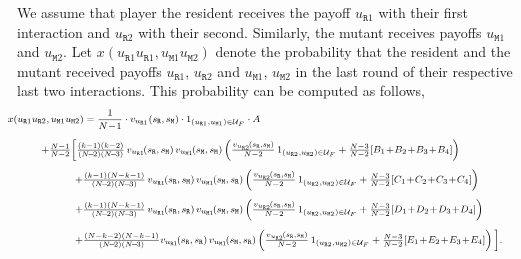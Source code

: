 \documentclass[11pt]{article}
\def\resident{\texttt{R}}
\def\mutant{\texttt{M}}
\def\strategy{s}
\theoremstyle{plainCl1}
\theoremstyle{plainCl2}
\begin{document}

We assume that player the resident receives the payoff \(u_{\resident1}\) with their first interaction and \(u_{\resident 2}\) with their second.
Similarly, the mutant receives payoffs \(u_{\mutant 1}\) and \(u_{\mutant 2}\). 
Let \(x(u_{\resident1} u_{\resident1}, u_{\mutant 1} u_{\mutant 2})\) denote the probability that the resident and the mutant received payoffs  \(u_{\resident1}\), \(u_{\resident2}\) and \(u_{\mutant 1}\), \(u_{\mutant 2}\) in the last round of their respective last two interactions.
This probability can be computed as follows, 
\begin{equation} \label{Eq:xTwoInteractions} 
  \setlength{\arraycolsep}{0.5cm}
  \footnotesize
  \hspace*{-0.8cm} 
  \begin{array}{lll}
  \multicolumn{3}{l}{x(u_{\resident1}u_{\resident 2}, u_{\mutant 1}u_{\mutant 2})= \displaystyle \frac{1}{N\!-\!1}\cdot v_{u_{\resident1}}(\strategy_\resident,\strategy_\mutant)\cdot 1_{(u_{\resident1},u_{\mutant 1})\in \mathcal{U}_F} \cdot A }\\[0.4cm]
  
  &\multicolumn{2}{l}{+ \frac{N-1}{N-2} \biggl[
  \frac{(k - 1)(k - 2)}{(N\!-\!2)(N\!-\!3)}\,
  v_{u_{\resident1}}\!(\strategy_\resident,\strategy_\mutant) \, v_{u_{\mutant 1}}\!(\strategy_\mutant,\strategy_\mutant) 
  \left( \frac{v_{u_{\resident 2}}\!(\strategy_\resident,\strategy_\mutant)}{N-2} \, 1_{(u_{\resident 2},u_{\mutant 2})\in \mathcal{U}_F} +\frac{N-3}{N-2} [B_1 \!+\! B_2 \!+\! B_3 \!+\! B_4]\right)}\\[0.4cm] 

  &&+ \frac{\left(k - 1\right) \left(N - k - 1\right)}{(N\!-\!2)(N\!-\!3)}\,
  v_{u_{\resident1}}\!(\strategy_\resident,\strategy_\mutant) \, v_{u_{\mutant 1}}\!(\strategy_\mutant,\strategy_\resident)  
  \left(\frac{v_{u_{\resident 2}}\!(\strategy_\resident,\strategy_\mutant)}{N-2} \, 1_{(u_{\resident 2},u_{\mutant 2})\in \mathcal{U}_F} + \frac{N-3}{N-2} [C_1 \!+\! C_2 \!+\! C_3 \!+\! C_4]\right) \\[0.4cm] 
  
  &&+ \frac{\left(k - 1\right) \left(N - k - 1\right)}{(N\!-\!2)(N\!-\!3)} \,
  v_{u_{\resident1}}\!(\strategy_\resident,\strategy_\resident) \, v_{u_{\mutant 1}}\!(\strategy_\mutant,\strategy_\mutant)  
  \left(\frac{v_{u_{\resident 2}}\!(\strategy_\resident,\strategy_\mutant)}{N-2} \, 1_{(u_{\resident 2},u_{\mutant 2})\in \mathcal{U}_F} + \frac{N-3}{N-2} [D_1 \!+\! D_2 \!+\! D_3 \!+\! D_4]\right) \\[0.4cm] 
  
  &&+ \frac{\left(N - k - 2\right) \left(N - k - 1\right)}{(N\!-\!2)(N\!-\!3)} 
  v_{u_{\resident1}}\!(\strategy_\resident,\strategy_\resident) \, v_{u_{\mutant 1}}\!(\strategy_\mutant,\strategy_\resident)  
  \left(\frac{ v_{u_{\resident 2}}\!(\strategy_\resident,\strategy_\mutant)}{N-2} \,1_{(u_{\resident 2},u_{\mutant 2})\in \mathcal{U}_F} + \frac{N-3}{N - 2} [E_1 \!+\! E_2 \!+\! E_3 \!+\! E_4]\right) \biggl] .
  \end{array}
\end{equation}
\end{document}
